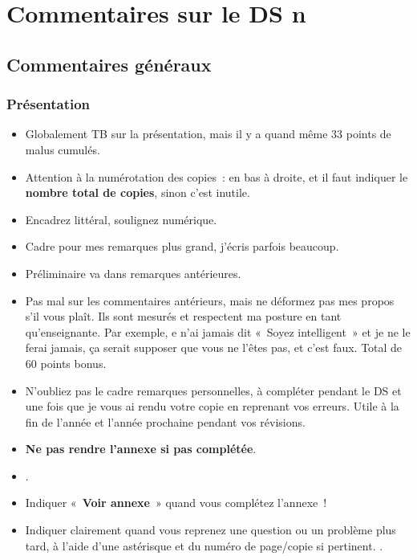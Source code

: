 \documentclass[a4paper, 11pt, final, garamond]{book}
\begin{document}
\setcounter{chapter}{0}

\def\lspace{25}

\chapter{Commentaires sur le DS n}
\section{Commentaires généraux}

\subsection{Présentation}

\begin{itemize}
	\item Globalement TB sur la présentation, mais il y a quand même 33 points de
	      malus cumulés.
	\item Attention à la numérotation des copies~: en bas à droite, et il faut
	      indiquer le \textbf{nombre total de copies}, sinon c'est inutile.
	\item Encadrez littéral, soulignez numérique.
	\item Cadre pour mes remarques plus grand, j'écris parfois beaucoup.
	\item Préliminaire va dans remarques antérieures.
	\item Pas mal sur les commentaires antérieurs, mais ne déformez pas mes propos
	      s'il vous plaît. Ils sont mesurés et respectent ma posture en tant
	      qu'enseignante. Par exemple, e n'ai jamais dit «~Soyez intelligent~» et je
	      ne le ferai jamais, ça serait supposer que vous ne l'êtes pas, et c'est
	      faux. Total de 60 points bonus.
	\item N'oubliez pas le cadre remarques personnelles, à compléter pendant le DS
	      et une fois que je vous ai rendu votre copie en reprenant vos erreurs. Utile
	      à la fin de l'année et l'année prochaine pendant vos révisions.
	\item \textbf{Ne pas rendre l'annexe si pas complétée}.
	\item {}.
	\item Indiquer «~\textbf{Voir annexe}~» quand vous complétez l'annexe~!
	\item Indiquer clairement quand vous reprenez une question ou un problème plus
	      tard, à l'aide d'une astérisque et du numéro de page/copie si pertinent.
	      .
\end{itemize}
\end{document}

